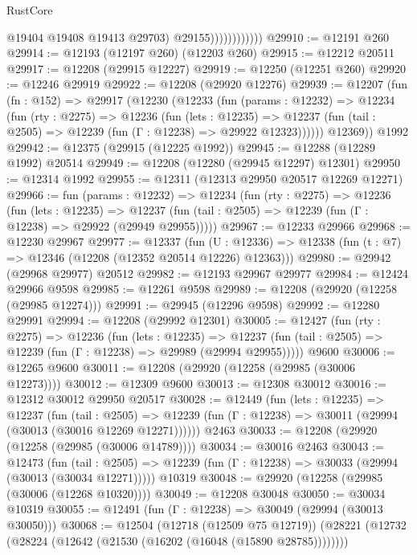 \begin{lexlean}{RustCore}
\begin{coremodule}
                              @19404
                              @19408
                              @19413
                              @29703)
                            @29155))))))))))))
@29910 := @12191 @260
@29914 := @12193 (@12197 @260) (@12203 @260)
@29915 := @12212 @20511
@29917 := @12208 (@29915 @12227)
@29919 := @12250 (@12251 @260)
@29920 := @12246 @29919
@29922 := @12208 (@29920 @12276)
@29939 := @12207
    (fun (fn : @152) =>
    @29917
      (@12230
        (@12233
          (fun (params : @12232) =>
          @12234
            (fun (rty : @2275) =>
            @12236
              (fun (lets : @12235) =>
              @12237 (fun (tail : @2505) => @12239 (fun (Γ : @12238) => @29922 @12323))))))
        @12369))
    @1992
@29942 := @12375 (@29915 (@12225 @1992))
@29945 := @12288 (@12289 @1992) @20514
@29949 := @12208 (@12280 (@29945 @12297) @12301)
@29950 := @12314 @1992
@29955 := @12311 (@12313 @29950 @20517 @12269 @12271)
@29966 := fun (params : @12232) =>
  @12234
    (fun (rty : @2275) =>
    @12236
      (fun (lets : @12235) =>
      @12237 (fun (tail : @2505) => @12239 (fun (Γ : @12238) => @29922 (@29949 @29955)))))
@29967 := @12233 @29966
@29968 := @12230 @29967
@29977 := @12337
    (fun (U : @12336) => @12338 (fun (t : @7) => @12346 (@12208 (@12352 @20514 @12226) @12363)))
@29980 := @29942 (@29968 @29977) @20512
@29982 := @12193 @29967 @29977
@29984 := @12424 @29966 @9598
@29985 := @12261 @9598
@29989 := @12208 (@29920 (@12258 (@29985 @12274)))
@29991 := @29945 (@12296 @9598)
@29992 := @12280 @29991
@29994 := @12208 (@29992 @12301)
@30005 := @12427
    (fun (rty : @2275) =>
    @12236
      (fun (lets : @12235) =>
      @12237 (fun (tail : @2505) => @12239 (fun (Γ : @12238) => @29989 (@29994 @29955)))))
    @9600
@30006 := @12265 @9600
@30011 := @12208 (@29920 (@12258 (@29985 (@30006 @12273))))
@30012 := @12309 @9600
@30013 := @12308 @30012
@30016 := @12312 @30012 @29950 @20517
@30028 := @12449
    (fun (lets : @12235) =>
    @12237
      (fun (tail : @2505) =>
      @12239 (fun (Γ : @12238) => @30011 (@29994 (@30013 (@30016 @12269 @12271))))))
    @2463
@30033 := @12208 (@29920 (@12258 (@29985 (@30006 @14789))))
@30034 := @30016 @2463
@30043 := @12473
    (fun (tail : @2505) => @12239 (fun (Γ : @12238) => @30033 (@29994 (@30013 (@30034 @12271)))))
    @10319
@30048 := @29920 (@12258 (@29985 (@30006 (@12268 @10320))))
@30049 := @12208 @30048
@30050 := @30034 @10319
@30055 := @12491 (fun (Γ : @12238) => @30049 (@29994 (@30013 @30050)))
@30068 := @12504
    (@12718 (@12509 @75 @12719))
    (@28221 (@12732 (@28224 (@12642 (@21530 (@16202 (@16048 (@15890 @28785))))))))

\end{coremodule}
\end{lexlean}
